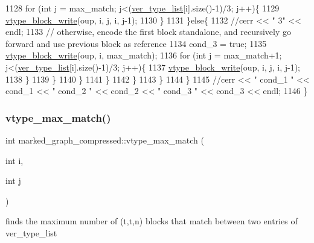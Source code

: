 \begin{DoxyCode}
1128               \textcolor{keywordflow}{for} (\textcolor{keywordtype}{int} j = max\_match; j<(\hyperlink{classmarked__graph__compressed_af2e3e55223d436628a02758dfae88493}{ver\_type\_list}[i].size()-1)/3; j++)\{
1129                 \hyperlink{classmarked__graph__compressed_a31f9ea72682f9072d0f90faf58a603fe}{vtype\_block\_write}(oup, i, j, i, j-1);
1130               \}
1131             \}\textcolor{keywordflow}{else}\{
1132               \textcolor{comment}{//cerr << " 3" << endl;}
1133               \textcolor{comment}{// otherwise, encode the first block standalone, and recursively go forward and use previous
       block as reference}
1134               cond\_3 = \textcolor{keyword}{true};
1135               \hyperlink{classmarked__graph__compressed_a31f9ea72682f9072d0f90faf58a603fe}{vtype\_block\_write}(oup, i, max\_match);
1136               \textcolor{keywordflow}{for} (\textcolor{keywordtype}{int} j = max\_match+1; j<(\hyperlink{classmarked__graph__compressed_af2e3e55223d436628a02758dfae88493}{ver\_type\_list}[i].size()-1)/3; j++)\{
1137                 \hyperlink{classmarked__graph__compressed_a31f9ea72682f9072d0f90faf58a603fe}{vtype\_block\_write}(oup, i, j, i, j-1);
1138               \}
1139             \}
1140           \}
1141         \}
1142       \}
1143     \}
1144   \}
1145   \textcolor{comment}{//cerr << " cond\_1 " << cond\_1 << " cond\_2 " << cond\_2 << " cond\_3 " << cond\_3 << endl;}
1146 \}
\end{DoxyCode}
\mbox{\label{classmarked__graph__compressed_a5ce51414e335d817f4be781fdcfbe9b1}} 
\subsubsection{\texorpdfstring{vtype\+\_\+max\+\_\+match()}{vtype\_max\_match()}}
{\footnotesize\ttfamily int marked\+\_\+graph\+\_\+compressed\+::vtype\+\_\+max\+\_\+match (\begin{DoxyParamCaption}\item[{int}]{i,  }\item[{int}]{j }\end{DoxyParamCaption})}



finds the maximum number of (t,t\textquotesingle{},n) blocks that match between two entries of ver\+\_\+type\+\_\+list 


